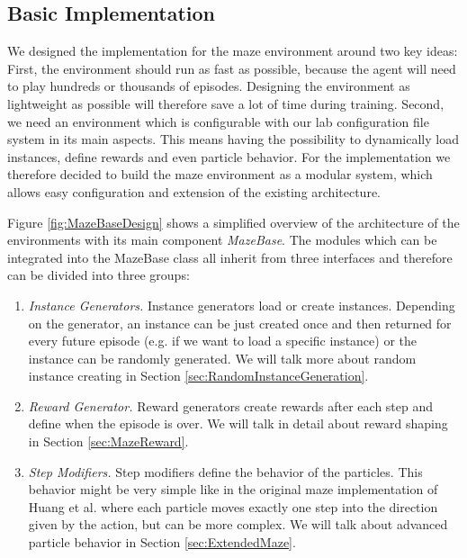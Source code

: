 \subsection{Basic Implementation} \label{sec:MazeImplementation}
We designed the implementation for the maze environment around two key ideas: First, the environment should run as fast as possible, because the agent will need to play hundreds or thousands of episodes. Designing the environment as lightweight as possible will therefore save a lot of time during training. Second, we need an environment which is configurable with our lab configuration file system in its main aspects. This means having the possibility to dynamically load instances, define rewards and even particle behavior. For the implementation we therefore decided to build the maze environment as a modular system, which allows easy configuration and extension of the existing architecture. 

Figure \ref{fig:MazeBaseDesign} shows a simplified overview of the architecture of the environments with its main component \textit{MazeBase}. The modules which can be integrated into the MazeBase class all inherit from three interfaces and therefore can be divided into three groups:

\begin{enumerate}
    \item \textit{Instance Generators.} Instance generators load or create instances. Depending on the generator, an instance can be just created once and then returned for every future episode (e.g. if we want to load a specific instance) or the instance can be randomly generated. We will talk more about random instance creating in Section \ref{sec:RandomInstanceGeneration}.
    \item \textit{Reward Generator.} Reward generators create rewards after each step and define when the episode is over. We will talk in detail about reward shaping in Section \ref{sec:MazeReward}.
    \item \textit{Step Modifiers.} Step modifiers define the behavior of the particles. This behavior might be very simple like in the original maze implementation of Huang et al. where each particle moves exactly one step into the direction given by the action, but can be more complex. We will talk about advanced particle behavior in Section \ref{sec:ExtendedMaze}. 
\end{enumerate}

